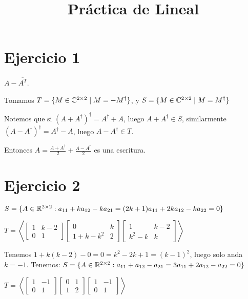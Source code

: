 \documentclass{article}
\title {Práctica de Lineal}
\begin{document}
	\maketitle
	\section{Ejercicio 1}
	$A - \overline{A^T}$.

	Tomamos $T = \{M \in \mathbb{C}^{2 \times 2} \mid M = - M^\dag\}$,
	y $S = \{M \in \mathbb{C}^{2 \times 2} \mid M = M^\dag\}$

	Notemos que si $(A + A^\dag)^\dag = A^\dag + A$, luego $A + A^\dag \in S$,
	similarmente $(A - A^\dag)^\dag = A^\dag - A$, luego $A - A^\dag \in T$.

	Entonces $A = \frac{A + A^\dag}{2} + \frac{A - A^\dag}{2}$ es una escritura.
	\section{Ejercicio 2}
	$S = \{A \in \mathbb{R}^{2 \times 2} : a_{11} + ka_{12} - ka_{21} = (2k+1)a_{11}
	+ 2ka_{12} - ka_{22} = 0\}$

	$T = \left\langle
		\begin{bmatrix}
			1 & k-2 \\
			0 & 1
		\end{bmatrix}
		\begin{bmatrix}
			0 & k \\
			1+k-k^2 & 2
		\end{bmatrix}
		\begin{bmatrix}
			1 & k-2 \\
			k^2 - k & k
		\end{bmatrix}
	\right\rangle$

	Tenemos $1 + k(k-2) - 0 = 0 = k^2 - 2k + 1 = (k-1)^2$, luego solo anda $k = -1$.
	Tenemos:
	$S = \{A \in \mathbb{R}^{2 \times 2} : a_{11} + a_{12} - a_{21} = 3a_{11}
	+ 2a_{12} - a_{22} = 0\}$

	$T = \left\langle
		\begin{bmatrix}
			1 & -1 \\
			0 & 1
		\end{bmatrix}
		\begin{bmatrix}
			0 & 1 \\
			1 & 2
		\end{bmatrix}
		\begin{bmatrix}
			1 & -1 \\
			0 & 1
		\end{bmatrix}
	\right\rangle$
\end{document}
